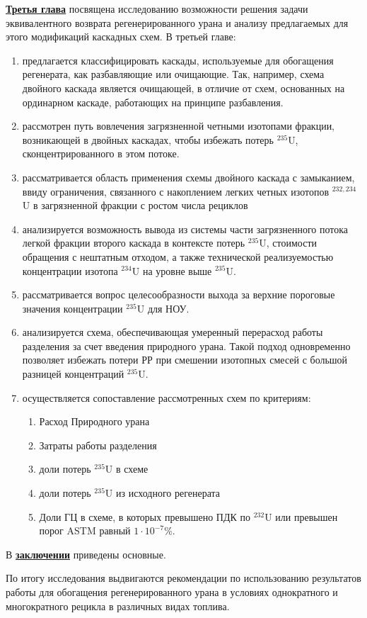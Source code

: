 \underline{\textbf{Третья глава}} посвящена исследованию возможности решения задачи эквивалентного возврата регенерированного урана и анализу предлагаемых для этого модификаций каскадных схем.
В третьей главе:
\begin{enumerate}
  \item предлагается классифицировать каскады, ис­пользуемые для обогащения регенерата, как разбавляющие или очищающие. Так, например, схема двойного каскада является очищающей, в отличие от схем, осно­ванных на ординарном каскаде, работающих на принципе разбавления.
  \item рассмотрен путь вовлечения загрязненной четными изотопами фракции, возникающей в двойных каскадах, чтобы избежать потерь $^{235}$U, сконцентрированного в этом потоке.
  \item рассматривается область применения схемы двойного каскада с замыканием, ввиду ограничения, связанного с накоплением легких четных изотопов $^{232,234}$U в загрязненной фракции с ростом числа рециклов
  \item анализируется возможность вывода из системы части загрязненного потока легкой фракции второго каскада в контексте потерь $^{235}$U, стоимости обращения с нештатным отходом, а также технической реализуемостью концентрации изотопа $^{234}$U на уровне выше $^{235}$U.
  \item рассматривается вопрос целесообразности выхода за верхние пороговые значения концентрации $^{235}$U для НОУ.
  \item анализируется схема, обеспечивающая умеренный перерасход работы разделения за счет введения природного урана. Такой подход одновременно позволяет избежать потери РР при смешении изотопных смесей с большой разницей концентраций $^{235}$U.
  \item осуществляется сопоставление рассмотренных схем по критериям:
  \begin{enumerate}
    \item Расход Природного урана
    \item Затраты работы разделения
    \item доли потерь $^{235}$U в схеме
    \item доли потерь $^{235}$U из исходного регенерата
    \item Доли ГЦ в схеме, в которых превышено ПДК по $^{232}$U или превышен порог ASTM равный $1\cdot10^{-7}$\%.
  \end{enumerate}  
\end{enumerate}

В \underline{\textbf{заключении}} приведены основные.

По итогу исследования выдвигаются рекомендации по использованию результатов работы для обогащения регенерированного урана в условиях однократного и многократного рецикла в различных видах топлива.



\insertbibliofull   



